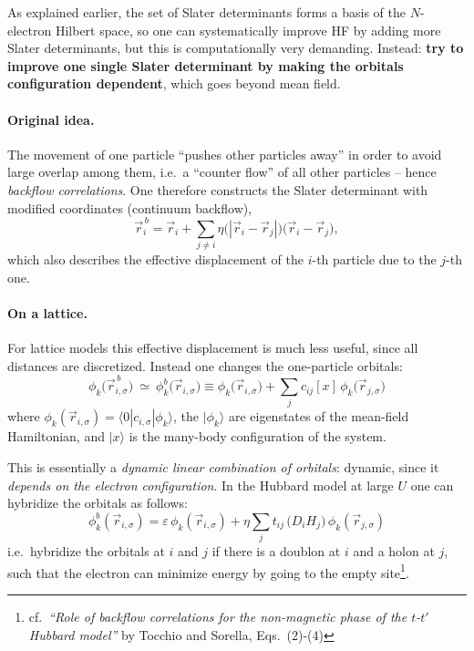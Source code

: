 \documentclass[../../main.tex]{subfiles}
\begin{document}
As explained earlier, the set of Slater determinants forms a basis of the
$N$-electron Hilbert space, so one can systematically improve HF by adding more
Slater determinants, but this is computationally very demanding. Instead:
\textbf{try to improve one single Slater determinant by making the orbitals
configuration dependent}, which goes beyond mean field.

\paragraph{Original idea.}
The movement of one particle ``pushes other particles away'' in order to avoid
large overlap among them, i.e.\ a ``counter flow'' of all other particles --
hence \emph{backflow correlations}. One therefore constructs the Slater
determinant with modified coordinates (continuum backflow),
\begin{equation}
\vec r_i^{\,b}=\vec r_i+\sum_{j\neq i}\eta\big(|\vec r_i-\vec r_j|\big)
\big(\vec r_i-\vec r_j\big),
\end{equation}
which also describes the effective displacement of the $i$-th particle due to the
$j$-th one.

\paragraph{On a lattice.}
For lattice models this effective displacement is much less useful, since all
distances are discretized. Instead one changes the one-particle orbitals:
\begin{equation}
\phi_k\big(\vec r^{\,b}_{i,\sigma}\big)\ \simeq\ \phi^b_k\big(\vec r_{i,\sigma}\big)
\equiv \phi_k\big(\vec r_{i,\sigma}\big)+\sum_j c_{ij}[x]\,\phi_k\big(\vec r_{j,\sigma}\big)
\end{equation}
where $\phi_k(\vec r_{i,\sigma})=\langle 0|c_{i,\sigma}|\phi_k\rangle$, the
$|\phi_k\rangle$ are eigenstates of the mean-field Hamiltonian, and $|x\rangle$ is
the many-body configuration of the system.

This is essentially a \emph{dynamic linear combination of orbitals}: dynamic,
since it \emph{depends on the electron configuration}. In the Hubbard model at
large $U$ one can hybridize the orbitals as follows:
\begin{equation}
\phi^b_k(\vec r_{i,\sigma})=\varepsilon\,\phi_k(\vec r_{i,\sigma})
+\eta\sum_j t_{ij}\,\big(D_i H_j\big)\,\phi_k(\vec r_{j,\sigma})
\end{equation}
i.e.\ hybridize the orbitals at $i$ and $j$ if there is a doublon at $i$ and a
holon at $j$, such that the electron can minimize energy by going to the empty
site\footnote{cf.\ \emph{``Role of
backflow correlations for the non-magnetic phase of the $t$-$t'$ Hubbard model''} by Tocchio and Sorella, Eqs.~(2)-(4)}.
\end{document}
